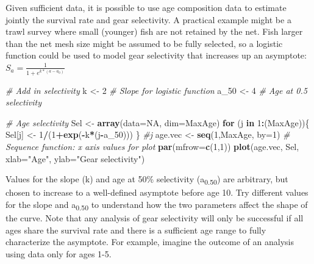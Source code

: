\documentclass[
]{krantz}
\makeatletter
\newenvironment{Shaded}{\begin{snugshade}}{\end{snugshade}}
\newcommand{\AttributeTok}[1]{\textcolor[rgb]{0.27,0.27,0.27}{#1}}
\newcommand{\CommentTok}[1]{\textcolor[rgb]{0.37,0.37,0.37}{\textit{#1}}}
\newcommand{\ConstantTok}[1]{\textcolor[rgb]{0.37,0.37,0.37}{#1}}
\newcommand{\ControlFlowTok}[1]{\textcolor[rgb]{0.27,0.27,0.27}{\textbf{#1}}}
\newcommand{\DecValTok}[1]{\textcolor[rgb]{0.06,0.06,0.06}{#1}}
\newcommand{\FunctionTok}[1]{\textcolor[rgb]{0.27,0.27,0.27}{\textbf{#1}}}
\newcommand{\NormalTok}[1]{#1}
\newcommand{\OtherTok}[1]{\textcolor[rgb]{0.37,0.37,0.37}{#1}}
\newcommand{\SpecialCharTok}[1]{\textcolor[rgb]{0.43,0.43,0.43}{\textbf{#1}}}
\newcommand{\StringTok}[1]{\textcolor[rgb]{0.5,0.5,0.5}{#1}}
\newenvironment{kframe}{%
\medskip{}
\setlength{\fboxsep}{.8em}
 \def\at@end@of@kframe{}%
 \ifinner\ifhmode%
  \def\at@end@of@kframe{\end{minipage}}%
  \begin{minipage}{\columnwidth}%
 \fi\fi%
 \def\FrameCommand##1{\hskip\@totalleftmargin \hskip-\fboxsep
 \colorbox{shadecolor}{##1}\hskip-\fboxsep
     \hskip-\linewidth \hskip-\@totalleftmargin \hskip\columnwidth}%
 \MakeFramed {\advance\hsize-\width
   \@totalleftmargin\z@ \linewidth\hsize
   \@setminipage}}%
 {\par\unskip\endMakeFramed%
 \at@end@of@kframe}
\renewenvironment{Shaded}{\begin{kframe}}{\end{kframe}}
\makeatother
\begin{document}
Given sufficient data, it is possible to use age composition data to estimate jointly the survival rate and gear selectivity. A practical example might be a trawl survey where small (younger) fish are not retained by the net. Fish larger than the net mesh size might be assumed to be fully selected, so a logistic function could be used to model gear selectivity that increases up an asymptote: \(S_{a} = \frac{1}{1+e^{k*(a-a_{0})}}\)

\begin{Shaded}
\begin{Highlighting}[]
\CommentTok{\# Add in selectivity}
\NormalTok{k }\OtherTok{\textless{}{-}} \DecValTok{2} \CommentTok{\# Slope for logistic function}
\NormalTok{a\_50 }\OtherTok{\textless{}{-}} \DecValTok{4} \CommentTok{\# Age at 0.5 selectivity}

\CommentTok{\# Age selectivity}
\NormalTok{Sel }\OtherTok{\textless{}{-}} \FunctionTok{array}\NormalTok{(}\AttributeTok{data=}\ConstantTok{NA}\NormalTok{, }\AttributeTok{dim=}\NormalTok{MaxAge)}
\ControlFlowTok{for}\NormalTok{ (j }\ControlFlowTok{in} \DecValTok{1}\SpecialCharTok{:}\NormalTok{(MaxAge))\{}
\NormalTok{  Sel[j] }\OtherTok{\textless{}{-}} \DecValTok{1}\SpecialCharTok{/}\NormalTok{(}\DecValTok{1}\SpecialCharTok{+}\FunctionTok{exp}\NormalTok{(}\SpecialCharTok{{-}}\NormalTok{k}\SpecialCharTok{*}\NormalTok{(j}\SpecialCharTok{{-}}\NormalTok{a\_50)))}
\NormalTok{\} }\CommentTok{\#j}
\NormalTok{age.vec }\OtherTok{\textless{}{-}} \FunctionTok{seq}\NormalTok{(}\DecValTok{1}\NormalTok{,MaxAge, }\AttributeTok{by=}\DecValTok{1}\NormalTok{)  }\CommentTok{\# Sequence function: x axis values for plot}
\FunctionTok{par}\NormalTok{(}\AttributeTok{mfrow=}\FunctionTok{c}\NormalTok{(}\DecValTok{1}\NormalTok{,}\DecValTok{1}\NormalTok{))}
\FunctionTok{plot}\NormalTok{(age.vec, Sel, }\AttributeTok{xlab=}\StringTok{"Age"}\NormalTok{, }\AttributeTok{ylab=}\StringTok{"Gear selectivity"}\NormalTok{)}
\end{Highlighting}
\end{Shaded}

Values for the slope (k) and age at 50\% selectivity (a\textsubscript{0.50}) are arbitrary, but chosen to increase to a well-defined asymptote before age 10. Try different values for the slope and a\textsubscript{0.50} to understand how the two parameters affect the shape of the curve. Note that any analysis of gear selectivity will only be successful if all ages share the survival rate and there is a sufficient age range to fully characterize the asymptote. For example, imagine the outcome of an analysis using data only for ages 1-5.
\end{document}
